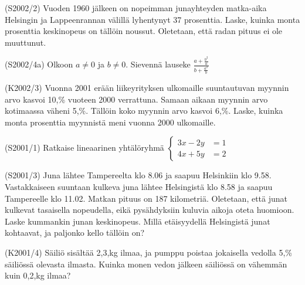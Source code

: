 \begin{tehtava}(S2002/2)   Vuoden 1960 jälkeen on nopeimman junayhteyden matka-aika Helsingin ja Lappeenrannan välillä lyhentynyt 37 prosenttia. Laske, kuinka monta prosenttia keskinopeus on tällöin noussut. Oletetaan, että radan pituus ei ole muuttunut.
\end{tehtava}

\begin{tehtava}(S2002/4a)  Olkoon $ a \neq 0$ ja $b \neq 0 $. Sievennä lauseke
                        $
                            \frac{a + \frac{b^2}{a} } {b + \frac{a^2}{b} }
                        $
\end{tehtava}

\begin{tehtava}(K2002/3)   Vuonna 2001 erään liikeyrityksen ulkomaille suuntautuvan
                        myynnin arvo kasvoi 10,\% vuoteen 2000 verrattuna. Samaan
                        aikaan myynnin arvo kotimaassa väheni 5,\%. Tällöin koko
                        myynnin arvo kasvoi 6,\%. Laske, kuinka monta prosenttia
                        myynnistä meni vuonna 2000 ulkomaille.
\end{tehtava}

\begin{tehtava}(S2001/1)   Ratkaise lineaarinen yhtälöryhmä
                       $
                         \left\{
                          \begin{aligned}
                             3x - 2y &= 1 \\
                             4x + 5y &= 2                      
                         \end{aligned}
                         \right.
                       $
\end{tehtava}

\begin{tehtava}(S2001/3)   Juna lähtee Tampereelta klo 8.06 ja saapuu Helsinkiin klo 9.58.
                        Vastakkaiseen suuntaan kulkeva juna lähtee Helsingistä klo 8.58
                        ja saapuu Tampereelle klo 11.02. Matkan pituus on 187 kilometriä.
                        Oletetaan, että junat kulkevat tasaisella nopeudella, eikä
                        pysähdyksiin kuluvia aikoja oteta huomioon. Laske kummankin
                        junan keskinopeus. Millä etäisyydellä Helsingistä junat
                        kohtaavat, ja paljonko kello tällöin on? 
\end{tehtava}

\begin{tehtava}(K2001/4)   Säiliö sisältää 2,3,kg ilmaa, ja pumppu poistaa jokaisella
                        vedolla 5,\% säiliössä olevasta ilmasta. Kuinka monen vedon
                        jälkeen säiliössä on vähemmän kuin 0,2,kg ilmaa?
\end{tehtava}

